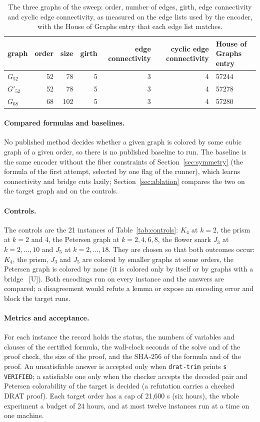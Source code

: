 \documentclass[11pt]{article}
\theoremstyle{definition}
\theoremstyle{remark}
\newcommand{\Ga}{G_{52}}
\newcommand{\Gb}{G'_{52}}
\newcommand{\Gsix}{G_{68}}
\newcommand{\evU}{\textnormal{[U]}}
\begin{document}
\begin{table}[t]\centering\small
\begin{tabular}{lrrrrrl}
\toprule
graph & order & size & girth & edge connectivity & cyclic edge connectivity & House of Graphs entry \\
\midrule
$\Ga$ & 52 & 78 & 5 & 3 & 4 & 57244 \\
$\Gb$ & 52 & 78 & 5 & 3 & 4 & 57278 \\
$\Gsix$ & 68 & 102 & 5 & 3 & 4 & 57280 \\
\bottomrule
\end{tabular}
\caption{The three graphs of the sweep: order, number of edges, girth, edge connectivity and cyclic edge connectivity, as measured on the edge lists used by the encoder, with the House of Graphs entry that each edge list matches.}\label{tab:graphs}
\end{table}

\paragraph{Compared formulas and baselines.} No published method decides whether a given graph is colored by some cubic graph of a given order, so there is no published baseline to run. The baseline is the same encoder without the
fiber constraints of Section~\ref{sec:symmetry} (the formula of the first attempt, selected by one flag of the runner), which learns connectivity and bridge cuts lazily; Section~\ref{sec:ablation} compares the two on the target graph and on the controls.

\paragraph{Controls.} The controls are the 21 instances of Table~\ref{tab:controls}: $K_4$ at $k = 2$, the prism at $k = 2$ and 4, the Petersen graph at $k = 2, 4, 6, 8$, the flower snark $J_3$ at $k = 2, \dots, 10$ and $J_5$ at $k = 2, \dots, 18$.
They are chosen so that both outcomes occur: $K_4$, the prism, $J_3$ and $J_5$ are colored by smaller graphs at some orders, the Petersen graph is colored by none (it is colored only by itself or by graphs with a bridge~\cite[Section~5.4]{GJMMMU2026} \evU{}). Both encodings run on every instance and
the answers are compared; a disagreement would refute a lemma or expose an encoding error and block the target runs.

\paragraph{Metrics and acceptance.} For each instance the record holds the status, the numbers of variables and clauses of the certified formula, the wall-clock seconds of the solve and of the proof check, the size of the proof, and the SHA-256 of the
formula and of the proof. An unsatisfiable answer is accepted only when \texttt{drat-trim} prints \texttt{s VERIFIED}; a satisfiable one only when the checker accepts the decoded pair and Petersen colorability of the target is decided (a refutation carries a checked DRAT proof).
Each target order has a cap of 21{,}600 s (six hours), the whole experiment a budget of 24 hours, and at most twelve instances run at a time on one machine.
\end{document}
